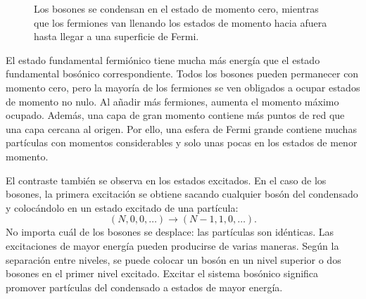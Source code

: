 \begin{figure}
\centering
{}
\caption{Los bosones se condensan en el estado de momento cero, mientras que los fermiones van llenando los estados de momento hacia afuera hasta llegar a una superficie de Fermi.}
\end{figure}

El estado fundamental fermiónico tiene mucha más energía que el estado fundamental bosónico correspondiente. Todos los bosones pueden permanecer con momento cero, pero la mayoría de los fermiones se ven obligados a ocupar estados de momento no nulo. Al añadir más fermiones, aumenta el momento máximo ocupado. Además, una capa de gran momento contiene más puntos de red que una capa cercana al origen. Por ello, una esfera de Fermi grande contiene muchas partículas con momentos considerables y solo unas pocas en los estados de menor momento.

El contraste también se observa en los estados excitados. En el caso de los bosones, la primera excitación se obtiene sacando cualquier bosón del condensado y colocándolo en un estado excitado de una partícula:
\begin{equation}
(N,0,0,\ldots)\longrightarrow (N-1,1,0,\ldots).
\end{equation}
No importa cuál de los bosones se desplace: las partículas son idénticas. Las excitaciones de mayor energía pueden producirse de varias maneras. Según la separación entre niveles, se puede colocar un bosón en un nivel superior o dos bosones en el primer nivel excitado. Excitar el sistema bosónico significa promover partículas del condensado a estados de mayor energía.


